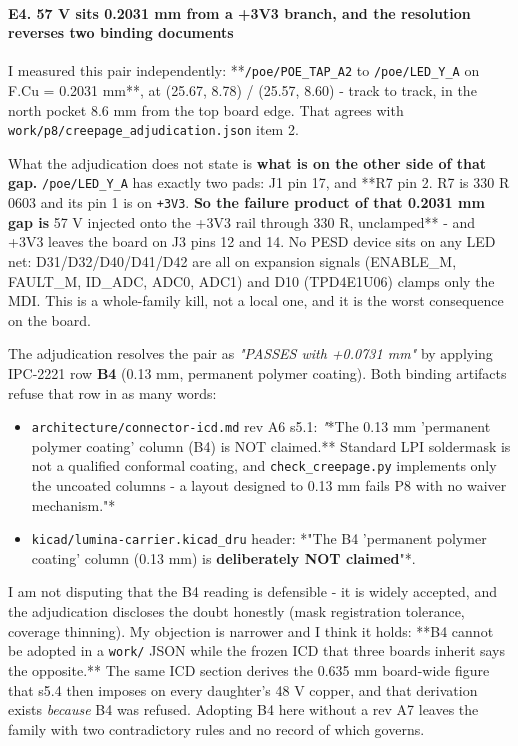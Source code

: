 \documentclass[11pt,a4paper]{article}
\begin{document}
\paragraph*{E4. 57 V sits 0.2031 mm from a +3V3 branch, and the resolution reverses two binding documents}
I measured this pair independently: {*}{*}\texttt{/poe/POE\_TAP\_A2} to \texttt{/poe/LED\_Y\_A} on F.Cu = 0.2031 mm{*}{*}, at (25.67, 8.78) / (25.57, 8.60) - track to track, in the north pocket 8.6 mm from the top board edge. That agrees with \texttt{work/p8/creepage\_adjudication.json} item 2.

What the adjudication does not state is \textbf{what is on the other side of that gap.} \texttt{/poe/LED\_Y\_A} has exactly two pads: J1 pin 17, and {*}{*}R7 pin 2. R7 is 330 R 0603 and its pin 1 is on \texttt{+3V3}.\textbf{ So the failure product of that 0.2031 mm gap is }57 V injected onto the +3V3 rail through 330 R, unclamped{*}{*} - and +3V3 leaves the board on J3 pins 12 and 14. No PESD device sits on any LED net: D31/D32/D40/D41/D42 are all on expansion signals (ENABLE\_M, FAULT\_M, ID\_ADC, ADC0, ADC1) and D10 (TPD4E1U06) clamps only the MDI. This is a whole-family kill, not a local one, and it is the worst consequence on the board.

The adjudication resolves the pair as \emph{"PASSES with +0.0731 mm"} by applying IPC-2221 row \textbf{B4} (0.13 mm, permanent polymer coating). Both binding artifacts refuse that row in as many words:

\begin{itemize}
\item \texttt{architecture/connector-icd.md} rev A6 s5.1: \emph{"}{*}The 0.13 mm 'permanent polymer
coating' column (B4) is NOT claimed.{*}{*} Standard LPI soldermask is not a qualified
conformal coating, and \texttt{check\_creepage.py} implements only the uncoated columns - a
layout designed to 0.13 mm fails P8 with no waiver mechanism."{*}
\item \texttt{kicad/lumina-carrier.kicad\_dru} header: {*}"The B4 'permanent polymer coating'
column (0.13 mm) is \textbf{deliberately NOT claimed}"{*}.
\end{itemize}
I am not disputing that the B4 reading is defensible - it is widely accepted, and the adjudication discloses the doubt honestly (mask registration tolerance, coverage thinning). My objection is narrower and I think it holds: {*}{*}B4 cannot be adopted in a \texttt{work/} JSON while the frozen ICD that three boards inherit says the opposite.{*}{*} The same ICD section derives the 0.635 mm board-wide figure that s5.4 then imposes on every daughter's 48 V copper, and that derivation exists \emph{because} B4 was refused. Adopting B4 here without a rev A7 leaves the family with two contradictory rules and no record of which governs.
\end{document}
